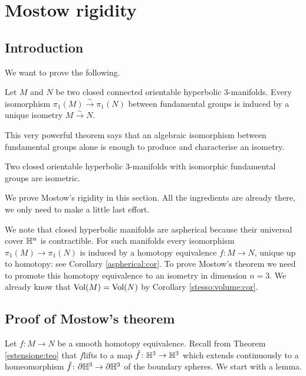 \section{Mostow rigidity}

\subsection{Introduction}
We want to prove the following.
\begin{teo} \label{Mostow:teo}
Let $M$ and $N$ be two closed connected orientable hyperbolic 3-manifolds. Every isomorphism $\pi_1(M) \stackrel \sim\to \pi_1(N)$ between fundamental groups is induced by a unique isometry $M\stackrel \sim\to N$.
\end{teo}
This very powerful theorem says that an algebraic isomorphism between fundamental groups alone is enough to produce and characterise an isometry. 

\begin{cor} Two closed orientable hyperbolic 3-manifolds with isomorphic fundamental groups are isometric.
\end{cor}

We prove Mostow's rigidity in this section. All the ingredients are already there, we only need to make a little last effort.

We note that closed hyperbolic manifolds are aspherical because their universal cover $\mathbb{H}^n$ is contractible. For such manifolds every isomorphism $\pi_1(M)\to \pi_1(N)$ is induced by a homotopy equivalence $f\colon M \to N$, unique up to homotopy: see Corollary \ref{aspherical:cor}. To prove Mostow's theorem we need to promote this homotopy equivalence to an isometry in dimension $n=3$. We already know that ${\rm Vol}(M) = {\rm Vol}(N)$ by Corollary \ref{stesso:volume:cor}.

\subsection{Proof of Mostow's theorem}
Let $f\colon M \to N$ be a smooth homotopy equivalence. Recall from Theorem \ref{estensione:teo} that $f$lifts to a map $\tilde f\colon \mathbb{H}^3 \to \mathbb{H}^3$ which extends continuously to a homeomorphism $\tilde f\colon\partial \mathbb{H}^3 \to \partial\mathbb{H}^3$ of the boundary spheres.
We start with a lemma.

